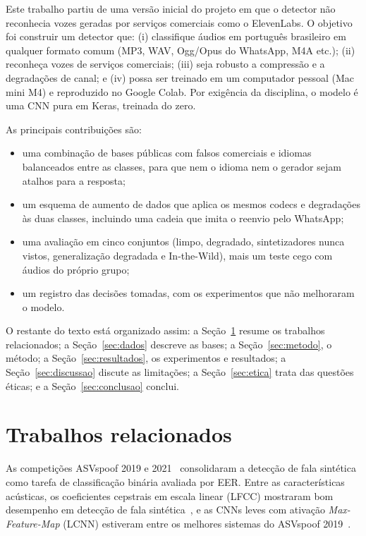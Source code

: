Este trabalho partiu de uma versão inicial do projeto em que o detector não reconhecia vozes geradas por serviços comerciais como o ElevenLabs. O objetivo foi construir um detector que: (i) classifique áudios em português brasileiro em qualquer formato comum (MP3, WAV, Ogg/Opus do WhatsApp, M4A etc.); (ii) reconheça vozes de serviços comerciais; (iii) seja robusto a compressão e a degradações de canal; e (iv) possa ser treinado em um computador pessoal (Mac mini M4) e reproduzido no Google Colab. Por exigência da disciplina, o modelo é uma CNN pura em Keras, treinada do zero.

As principais contribuições são:
\begin{itemize}
\item uma combinação de bases públicas com falsos comerciais e idiomas balanceados entre as classes, para que nem o idioma nem o gerador sejam atalhos para a resposta;
\item um esquema de aumento de dados que aplica os mesmos codecs e degradações às duas classes, incluindo uma cadeia que imita o reenvio pelo WhatsApp;
\item uma avaliação em cinco conjuntos (limpo, degradado, sintetizadores nunca vistos, generalização degradada e In-the-Wild), mais um teste cego com áudios do próprio grupo;
\item um registro das decisões tomadas, com os experimentos que não melhoraram o modelo.
\end{itemize}

O restante do texto está organizado assim: a Seção~\ref{sec:relacionados} resume os trabalhos relacionados; a Seção~\ref{sec:dados} descreve as bases; a Seção~\ref{sec:metodo}, o método; a Seção~\ref{sec:resultados}, os experimentos e resultados; a Seção~\ref{sec:discussao} discute as limitações; a Seção~\ref{sec:etica} trata das questões éticas; e a Seção~\ref{sec:conclusao} conclui.


\section{Trabalhos relacionados}
\label{sec:relacionados}

As competições ASVspoof 2019 e 2021~\citep{todisco2019asvspoof,liu2023asvspoof2021} consolidaram a detecção de fala sintética como tarefa de classificação binária avaliada por EER. Entre as características acústicas, os coeficientes cepstrais em escala linear (LFCC) mostraram bom desempenho em detecção de fala sintética~\citep{sahidullah2015features}, e as CNNs leves com ativação \textit{Max-Feature-Map} (LCNN) estiveram entre os melhores sistemas do ASVspoof 2019~\citep{lavrentyev2019stc}.

